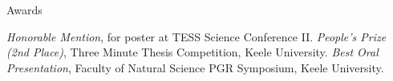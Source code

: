 \begin{rubric}{Awards}

\entry*[2021]
    \textit{Honorable Mention}, for poster at TESS Science Conference II.
\entry*[2021]
    \textit{People's Prize (2nd Place)}, Three Minute Thesis Competition, Keele University.
\entry*[2021]
    \textit{Best Oral Presentation}, Faculty of Natural Science PGR Symposium, Keele University. 

\end{rubric}